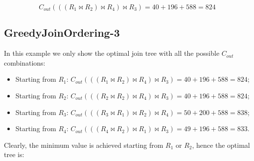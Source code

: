 \documentclass[12pt]{article}
\begin{document}
$$ C_{out}(((R_1 \bowtie R_2) \bowtie R_4) \bowtie R_3) = 40 + 196 + 588 = 824$$

\subsection{GreedyJoinOrdering-3}
In this example we only show the optimal join tree with all the possible $C_{out}$ combinations:
\begin{itemize}
	\item Starting from $R_1$: $ C_{out}(((R_1 \bowtie R_2) \bowtie R_4) \bowtie R_3) = 40 + 196 + 588 = 824$;
	\item Starting from $R_2$: $ C_{out}(((R_2 \bowtie R_2) \bowtie R_4) \bowtie R_3) = 40 + 196 + 588 = 824$;
	\item Starting from $R_3$: $ C_{out}(((R_3 \bowtie R_1) \bowtie R_2) \bowtie R_4) = 50 + 200 + 588 = 838$;
	\item Starting from $R_4$: $ C_{out}(((R_4 \bowtie R_2) \bowtie R_1) \bowtie R_3) = 49 + 196 + 588 = 833$.
\end{itemize}

Clearly, the minimum value is achieved starting from $R_1$ or $R_2$, hence the optimal tree is:

\end{document}
